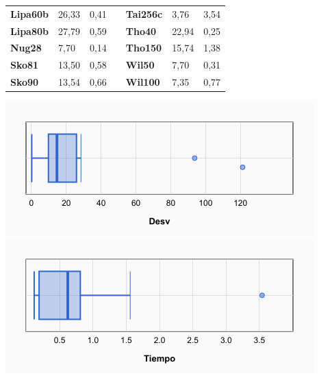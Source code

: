 \documentclass[a4paper, 12pt]{article}
\begin{document}
\begin{table}[H]
\begin{tabular}{|l|l|l|l|l|l|l|}
\textbf{Lipa60b}                    & 26,33                              & 0,41                                 &                                & \textbf{Tai256c}                   & 3,76                               & 3,54                                 \\ \cline{1-3} \cline{5-7} 
\textbf{Lipa80b}                    & 27,79                              & 0,59                                 &                                & \textbf{Tho40}                     & 22,94                              & 0,25                                 \\ \cline{1-3} \cline{5-7} 
\textbf{Nug28}                      & 7,70                               & 0,14                                 &                                & \textbf{Tho150}                    & 15,74                              & 1,38                                 \\ \cline{1-3} \cline{5-7} 
\textbf{Sko81}                      & 13,50                              & 0,58                                 &                                & \textbf{Wil50}                     & 7,70                               & 0,31                                 \\ \cline{1-3} \cline{5-7} 
\textbf{Sko90}                      & 13,54                              & 0,66                                 &                                & \textbf{Wil100}                    & 7,35                               & 0,77                                 \\ \cline{1-3} \cline{5-7} 
\end{tabular}
\end{table}

\begin{center}
         \includegraphics[scale=0.42]{boxplot-ageox-desv}
         \includegraphics[scale=0.42]{boxplot-ageox-time}
      \end{center}
      
\end{document}
